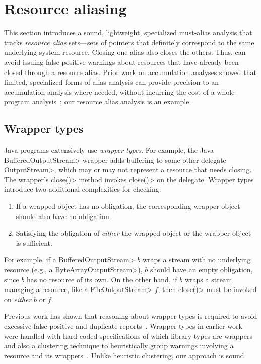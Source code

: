 \section{Resource aliasing}
\label{sec:must-call-choice}

This section introduces a sound, lightweight, specialized must-alias analysis
that tracks \emph{resource alias} sets---sets of pointers that
definitely correspond to the same underlying system resource.  Closing
one alias also closes the others.  Thus,
\Tool can avoid issuing false positive warnings about resources
that have already been closed through a resource alias.  Prior
work on accumulation analyses showed that limited, specialized forms
of alias analysis can provide precision to an accumulation analysis
where needed, without incurring the cost of a whole-program
analysis~\cite{KelloggRSSE2020}; our resource alias analysis is an
example.

\subsection{Wrapper types}

Java programs extensively use \emph{wrapper types}.  For example, the Java
\<BufferedOutputStream> wrapper adds buffering to some other delegate \<OutputStream>, which
may or may not represent a resource that needs closing.  The wrapper's 
\<close()> method invokes \<close()> on the delegate.
Wrapper types
introduce two additional complexities for \MustCall checking:
\begin{enumerate}
  \item If a wrapped object has no \MustCall obligation, the corresponding
  wrapper object should also have no obligation.
  \item Satisfying the obligation of \emph{either} the wrapped object or the
  wrapper object is sufficient.
\end{enumerate}
For example, if a \<BufferedOutputStream> $b$ wraps a stream with no underlying
resource (e.g., a \<ByteArrayOutputStream>), $b$ should have an empty
\MustCall obligation, since $b$ has no resource of its own.  On the other
hand, if $b$ wraps a stream managing a resource, like a \<FileOutputStream> $f$,
then \<close()> must be invoked on \emph{either} $b$ or $f$.

Previous work has shown that reasoning about wrapper types is
required to avoid excessive false positive and duplicate
reports~\cite{TorlakC10,ecj-resource-leak}.  Wrapper types in earlier
work were handled with hard-coded specifications of which library
types are wrappers and also a clustering technique to heuristically group warnings
involving a resource and its wrappers~\cite{TorlakC10}. Unlike heuristic clustering,
our approach is sound.

